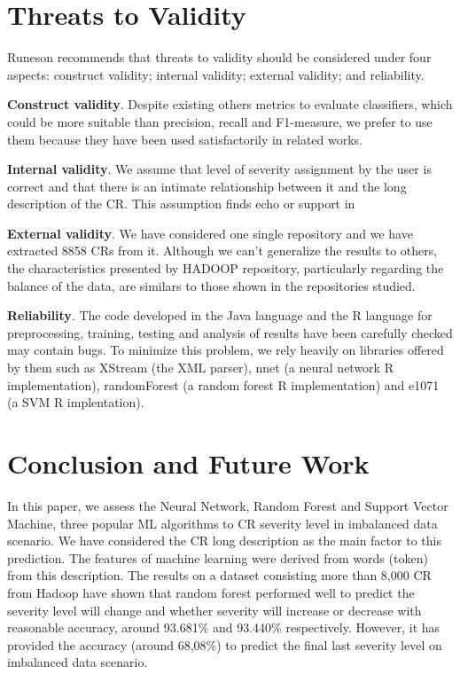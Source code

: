 \documentclass[10pt, conference]{IEEEtran}
\begin{document}
\section{Threats to Validity}   \label{threats}
Runeson \cite{Runeson2009} recommends that threats to validity should be considered under four aspects: construct validity;  internal validity; external validity; and reliability.

\textbf{Construct validity}. Despite existing others metrics to evaluate classifiers\cite{Facelli2015}, which could be more suitable than precision, recall and F1-measure, we prefer to use them because they have been used satisfactorily in related works\cite{Menzies2008, Lamkanfi2010, Lamkanfi2011, ValdiviaGarcia2014}.


\textbf{Internal validity}. We assume that level of severity assignment by the user is correct and that there is an intimate relationship between it and the long description of the CR. This assumption finds echo or support in \cite{Lamkanfi2010, Tian2012}

\textbf{External validity}. We have considered one single repository and we have extracted 8858 CRs from it. Although we can't generalize the results to others, the characteristics presented by HADOOP repository, particularly regarding the balance of the data, are similars to those shown in the repositories studied\cite{Lamkanfi2010, Lamkanfi2011, Tian2012,ValdiviaGarcia2014}.

\textbf{Reliability}. The code developed in the Java language and the R language for preprocessing, training, testing and analysis of results have been carefully checked may contain bugs. To minimize this problem, we rely heavily on libraries offered by them such as XStream (the XML parser), nnet (a neural network R implementation), randomForest (a random forest R implementation) and e1071 (a SVM R implentation). 

\section{Conclusion and Future Work} \label{sec:conclusion}
In this paper, we assess the Neural Network, Random Forest and Support Vector Machine, three popular ML algorithms to CR severity level in imbalanced data scenario. We have considered the CR long description as the main factor to
this prediction. The features of machine learning were derived from
words (token) from this description. The results on a dataset consisting more than
8,000 CR from Hadoop have shown that random forest performed well to predict the severity level will change and whether severity will increase or decrease with reasonable accuracy, around 93.681\% and 93.440\% respectively. However, it has provided the accuracy (around 68,08\%) to predict the final last severity level on imbalanced data scenario.
\end{document}

